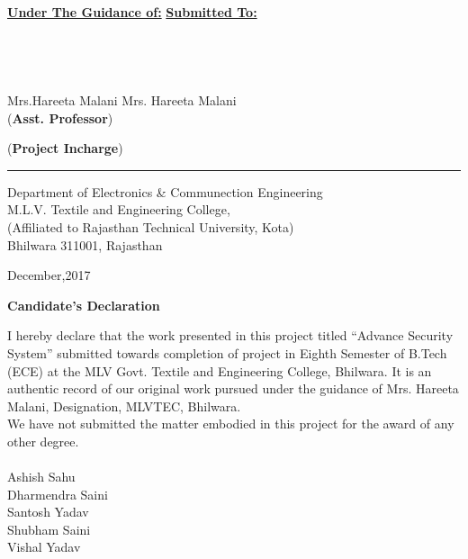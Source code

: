 \documentclass[twoside,a4paper,16pt]{book}
\begin{document}
	
	\vspace{0.3cm}
	
	
	\Large {\underline{\bf Under The Guidance of:}} \hspace{7.5cm} {\underline{\bf Submitted To:}}\\\\
	\\
	\\
	\\
	\hspace{-1.5cm}Mrs.Hareeta Malani  \hspace{9.4cm} Mrs. Hareeta Malani  \\{\small({\bf Asst. Professor})}\hspace{11.5cm} {\small({\bf Project Incharge})\\
	
	

	
	\begin{center}
		{
				{\rule{190mm}{0.2mm}}
			\small Department of Electronics \& Communection Engineering\\
			M.L.V. Textile and Engineering College,\\(Affiliated to Rajasthan Technical University, Kota)
			\\Bhilwara 311001, Rajasthan
			\vspace{0.1}
		
		{\small December,2017}
	}
	
	\end{center}

\newpage
\begin{center}
	\huge{\bf Candidate’s Declaration}

	
\end{center}
	
{\large 
	\vspace{1.5cm}
 I hereby declare that the work presented in this project titled “Advance Security System” submitted towards completion of project in Eighth Semester of B.Tech (ECE) at the MLV Govt. Textile and Engineering College, Bhilwara.  It is an authentic record of our original work pursued under the guidance of Mrs. Hareeta Malani, Designation, MLVTEC, Bhilwara. \\
 We have not submitted the matter embodied in this project for the award of any other degree. \\\vspace{2cm}\\
 
 Ashish Sahu\\
 Dharmendra Saini\\
 Santosh Yadav\\
 Shubham Saini\\
 Vishal Yadav\\\vspace{3cm}

}}
\end{document}
